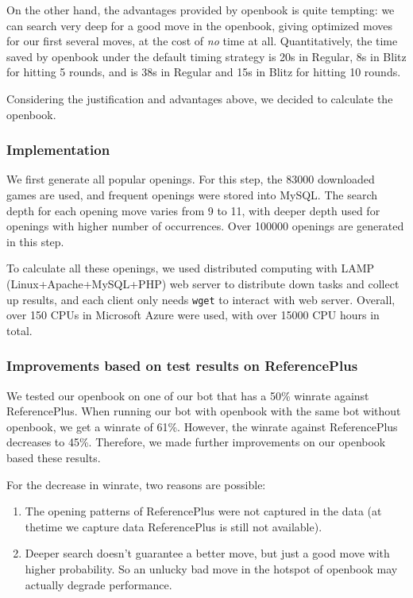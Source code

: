 \documentclass[10pt,twosidep]{article}
\begin{document}
On the other hand, the advantages provided by openbook is quite tempting: we can search very deep for a good move in the openbook, giving optimized moves for our first several moves, at the cost of {\it no} time at all. Quantitatively, the time saved by openbook under the default timing strategy is 20s in Regular, 8s in Blitz for hitting 5 rounds, and is 38s in Regular and 15s in Blitz for hitting 10 rounds. 

Considering the justification and advantages above, we decided to calculate the openbook. 

\subsubsection{Implementation}
We first generate all popular openings. For this step, the 83000 downloaded games are used, and frequent openings were stored into MySQL. The search depth for each opening move varies from 9 to 11, with deeper depth used for openings with higher number of occurrences. Over 100000 openings are generated in this step. 

To calculate all these openings, we used distributed computing with LAMP (Linux+Apache+MySQL+PHP) web server to distribute down tasks and collect up results, and each client only needs {\tt wget} to interact with web server. Overall, over 150 CPUs in Microsoft Azure were used, with over 15000 CPU hours in total. 

\subsubsection{Improvements based on test results on ReferencePlus}
We tested our openbook on one of our bot that has a 50\% winrate against ReferencePlus. When running our bot with openbook with the same bot without openbook, we get a winrate of 61\%. However, the winrate against ReferencePlus decreases to 45\%. Therefore, we made further improvements on our openbook based these results. 

For the decrease in winrate, two reasons are possible: 
\begin{enumerate}
    \item The opening patterns of ReferencePlus were not captured in the data (at thetime we capture data ReferencePlus is still not available).
    \item Deeper search doesn't guarantee a better move, but just a good move with higher probability. So an unlucky bad move in the hotspot of openbook may actually degrade performance.
\end{enumerate}
\end{document}
